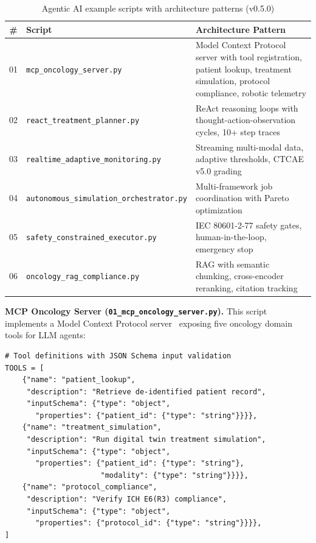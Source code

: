 \documentclass[10pt]{article}
\begin{document}
\begin{table}[H]
\centering
\caption{Agentic AI example scripts with architecture patterns (v0.5.0)}
\label{tab:agentic}
\small
\begin{tabular}{@{}clp{5cm}@{}}
\toprule
\textbf{\#} & \textbf{Script} & \textbf{Architecture Pattern} \\
\midrule
01 & \texttt{mcp\_oncology\_server.py} & Model Context Protocol server with tool registration, patient lookup, treatment simulation, protocol compliance, robotic telemetry \\
02 & \texttt{react\_treatment\_planner.py} & ReAct reasoning loops with thought-action-observation cycles, 10+ step traces \\
03 & \texttt{realtime\_adaptive\_monitoring.py} & Streaming multi-modal data, adaptive thresholds, CTCAE v5.0 grading \\
04 & \texttt{autonomous\_simulation\_orchestrator.py} & Multi-framework job coordination with Pareto optimization \\
05 & \texttt{safety\_constrained\_executor.py} & IEC 80601-2-77 safety gates, human-in-the-loop, emergency stop \\
06 & \texttt{oncology\_rag\_compliance.py} & RAG with semantic chunking, cross-encoder reranking, citation tracking \\
\bottomrule
\end{tabular}
\end{table}

\textbf{MCP Oncology Server (\texttt{01\_mcp\_oncology\_server.py}).} This script implements a Model Context Protocol server~\cite{mcp2025} exposing five oncology domain tools for LLM agents:

\begin{lstlisting}[caption={MCP tool registration pattern from \texttt{01\_mcp\_oncology\_server.py} (v0.5.0)}]
# Tool definitions with JSON Schema input validation
TOOLS = [
    {"name": "patient_lookup",
     "description": "Retrieve de-identified patient record",
     "inputSchema": {"type": "object",
       "properties": {"patient_id": {"type": "string"}}}},
    {"name": "treatment_simulation",
     "description": "Run digital twin treatment simulation",
     "inputSchema": {"type": "object",
       "properties": {"patient_id": {"type": "string"},
                      "modality": {"type": "string"}}}},
    {"name": "protocol_compliance",
     "description": "Verify ICH E6(R3) compliance",
     "inputSchema": {"type": "object",
       "properties": {"protocol_id": {"type": "string"}}}},
]
\end{lstlisting}
\end{document}
